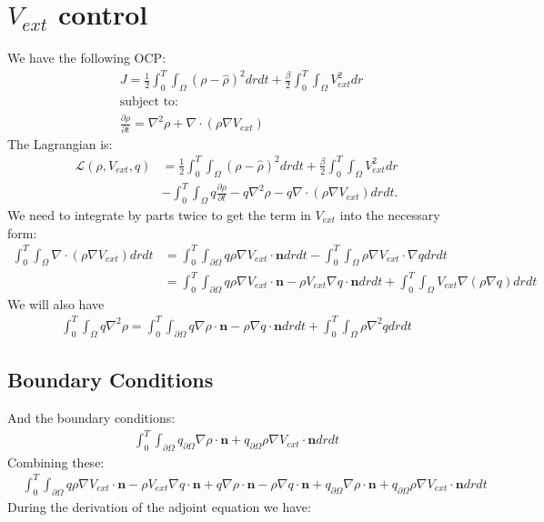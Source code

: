 \documentclass[11pt, a4paper]{article}
\theoremstyle{definition}
\newcommand{\n}{\mathbf{n}}
\begin{document}
	\section{$V_{ext}$ control}
	We have the following OCP:
	\begin{align*}
		&J = \frac{1}{2}\int_0^T \int_\Omega (\rho - \widehat \rho)^2 dr dt + \frac{\beta}{2} \int_0^T\int_\Omega V_{ext}^2 dr\\
		&\text{subject to:}\\
		&\frac{\partial \rho}{\partial t} = \nabla^2 \rho + \nabla \cdot (\rho \nabla V_{ext})
	\end{align*}
	The Lagrangian is:
	\begin{align*}
		\mathcal{L}(\rho, V_{ext}, q) &= \frac{1}{2}\int_0^T \int_\Omega (\rho - \widehat \rho)^2 dr dt + \frac{\beta}{2} \int_0^T\int_\Omega V_{ext}^2 dr\\
		&- \int_0^T \int_\Omega q\frac{\partial \rho}{\partial t} - q\nabla^2 \rho - q\nabla \cdot (\rho \nabla V_{ext}) dr dt.
	\end{align*}
	We need to integrate by parts twice to get the term in $V_{ext}$ into the necessary form:
	\begin{align*}
		\int_0^T \int_\Omega \nabla \cdot (\rho \nabla V_{ext}) dr dt &= \int_0^T \int_{\partial \Omega} q \rho \nabla V_{ext} \cdot \n dr dt - \int_0^T \int_\Omega \rho \nabla V_{ext} \cdot \nabla q dr dt \\
		& = \int_0^T \int_{\partial \Omega} q \rho \nabla V_{ext} \cdot \n  - \rho V_{ext} \nabla q \cdot \n dr dt + \int_0^T \int_\Omega V_{ext} \nabla (\rho \nabla q) dr dt
	\end{align*}
	We will also have 
	\begin{align*}
		\int_0^T \int_\Omega q\nabla^2 \rho = \int_0^T \int_{\partial \Omega} q \nabla \rho \cdot \n- \rho \nabla q \cdot \n dr dt + \int_0^T \int_\Omega \rho \nabla^2 q dr dt
	\end{align*}
	\subsection{Boundary Conditions}
	And the boundary conditions:
	\begin{align*}
		\int_0^T \int_{\partial \Omega} q_{\partial \Omega}\nabla \rho \cdot \n + q_{\partial \Omega}\rho \nabla V_{ext} \cdot \n dr dt
	\end{align*}
	Combining these:
	\begin{align*}
		&\int_0^T \int_{\partial \Omega} q \rho \nabla V_{ext} \cdot \n  - \rho V_{ext} \nabla q \cdot \n + q \nabla \rho \cdot \n - \rho \nabla q \cdot \n + q_{\partial \Omega}\nabla \rho \cdot \n + q_{\partial \Omega}\rho \nabla V_{ext} \cdot \n dr dt
	\end{align*}
	During the derivation of the adjoint equation we have:
\end{document}
